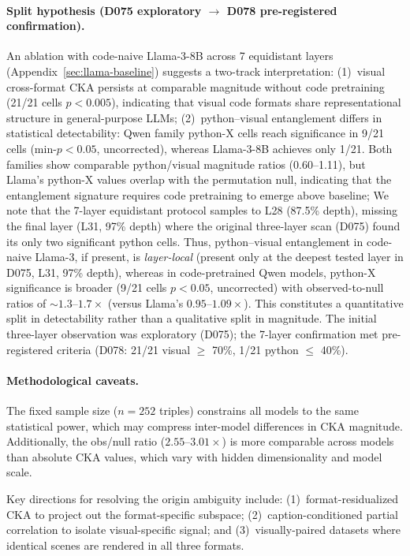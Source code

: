 \paragraph{Split hypothesis (D075 exploratory $\to$ D078 pre-registered confirmation).}
An ablation with code-naive Llama-3-8B across 7 equidistant layers (Appendix~\ref{sec:llama-baseline}) suggests a two-track interpretation:
(1)~visual cross-format CKA persists at comparable magnitude without code pretraining (21/21 cells $p < 0.005$), indicating that visual code formats share representational structure in general-purpose LLMs;
(2)~python--visual entanglement differs in statistical detectability: Qwen family python-X cells reach significance in 9/21 cells (min-$p<0.05$, uncorrected), whereas Llama-3-8B achieves only 1/21.
Both families show comparable python/visual magnitude ratios (0.60--1.11), but Llama's python-X values overlap with the permutation null, indicating that the entanglement signature requires code pretraining to emerge above baseline;
We note that the 7-layer equidistant protocol samples to L28 (87.5\% depth), missing the final layer (L31, 97\% depth) where the original three-layer scan (D075) found its only two significant python cells.
Thus, python--visual entanglement in code-naive Llama-3, if present, is \emph{layer-local} (present only at the deepest tested layer in D075, L31, 97\% depth), whereas in code-pretrained Qwen models, python-X significance is broader (9/21 cells $p<0.05$, uncorrected) with observed-to-null ratios of ${\sim}1.3$--$1.7\times$ (versus Llama's $0.95$--$1.09\times$).
This constitutes a quantitative split in detectability rather than a qualitative split in magnitude.
The initial three-layer observation was exploratory (D075); the 7-layer confirmation met pre-registered criteria (D078: 21/21 visual $\geq$ 70\%, 1/21 python $\leq$ 40\%).

\paragraph{Methodological caveats.}
The fixed sample size ($n{=}252$ triples) constrains all models to the same statistical power, which may compress inter-model differences in CKA magnitude.
Additionally, the obs/null ratio ($2.55$--$3.01\times$) is more comparable across models than absolute CKA values, which vary with hidden dimensionality and model scale.

Key directions for resolving the origin ambiguity include: (1)~format-residualized CKA to project out the format-specific subspace; (2)~caption-conditioned partial correlation to isolate visual-specific signal; and (3)~visually-paired datasets where identical scenes are rendered in all three formats.
